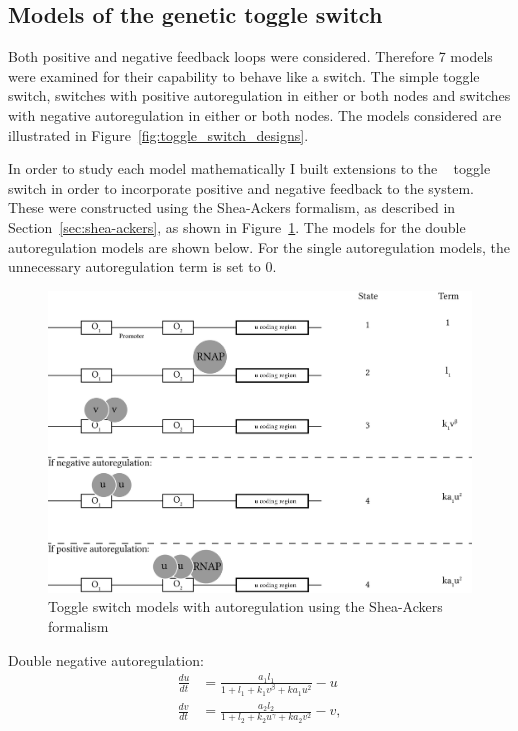 \subsection{Models of the genetic toggle switch}
\label{sec:models_bist}

Both positive and negative feedback loops were considered. Therefore 7 models were examined for their capability to behave like a switch. The simple toggle switch, switches with positive autoregulation in either or both nodes and switches with negative autoregulation in either or both nodes. The models considered are illustrated in Figure~\ref{fig:toggle_switch_designs}. 

 In order to study each model mathematically I built extensions to the ~\autocite{Gardner:2000vha} toggle switch in order to incorporate positive and negative feedback to the system. These were constructed using the Shea-Ackers formalism, as described in Section~\ref{sec:shea-ackers}, as shown in Figure~\ref{fig:sa-autoreg}. The models for the double autoregulation models are shown below. For the single autoregulation models, the unnecessary autoregulation term is set to 0.


\begin{figure}[tb]
\centerfloat
\includegraphics[scale=0.7]{../../chapters/chapterABCSysBio/images/shea-ackers_autoreg.png}
\caption[Toggle switch models with autoregulation using the Shea-Ackers formalism]{\label{fig:sa-autoreg}Toggle switch models with autoregulation using the Shea-Ackers formalism}
\end{figure}



\noindent Double negative autoregulation: 
\begin{align}\label{eq:gards_neg}
\frac{du}{dt} &= \frac{a_1  l_1}{1+l_1+k_1  v^{\beta} + ka_{1}  u^{2}} - u \\
\frac{dv}{dt} &= \frac{a_2  l_2}{1+l_2+k_2  u^{\gamma }+ ka_{2}  v^{2}} - v,
\end{align}

